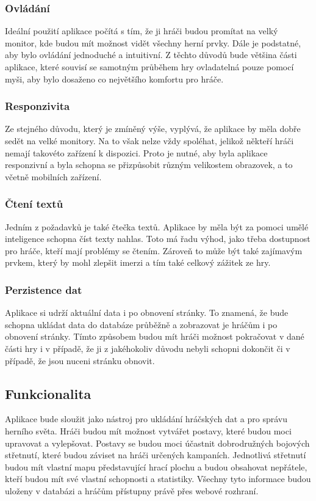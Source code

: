 \subsubsection*{Ovládání}
Ideální použití aplikace počítá s tím, že ji hráči budou promítat na velký monitor, kde budou mít možnost vidět všechny herní prvky. Dále je podstatné, aby bylo ovládání jednoduché a intuitivní. Z těchto důvodů bude většina části aplikace, které souvisí se samotným průběhem hry ovladatelná pouze pomocí myši, aby bylo dosaženo co největšího komfortu pro hráče.

\subsubsection*{Responzivita}
Ze stejného důvodu, který je zmíněný výše, vyplývá, že aplikace by měla dobře sedět na velké monitory. Na to však nelze vždy spoléhat, jelikož někteří hráči nemají takovéto zařízení k dispozici. Proto je nutné, aby byla aplikace responzivní a byla schopna se přizpůsobit různým velikostem obrazovek, a to včetně mobilních zařízení.

\subsubsection*{Čtení textů}
Jedním z požadavků je také čtečka textů. Aplikace by měla být za pomoci umělé inteligence schopna číst texty nahlas. Toto má řadu výhod, jako třeba dostupnost pro hráče, kteří mají problémy se čtením. Zároveň to může být také zajímavým prvkem, který by mohl zlepšit imerzi a tím také celkový zážitek ze hry.

\subsubsection*{Perzistence dat}
Aplikace si udrží aktuální data i po obnovení stránky. To znamená, že bude schopna ukládat data do databáze průběžně a zobrazovat je hráčům i po obnovení stránky. Tímto způsobem budou mít hráči možnost pokračovat v dané části hry i v případě, že ji z jakéhokoliv důvodu nebyli schopni dokončit či v případě, že jsou nuceni stránku obnovit.

\subsection{Funkcionalita}
Aplikace bude sloužit jako nástroj pro ukládání hráčských dat a pro správu herního světa. Hráči budou mít možnost vytvářet postavy, které budou moci upravovat a vylepšovat. Postavy se budou moci účastnit dobrodružných bojových střetnutí, které budou záviset na hráči určených kampaních. Jednotlivá střetnutí budou mít vlastní mapu představující hrací plochu a budou obsahovat nepřátele, kteří budou mít své vlastní schopnosti a statistiky. Všechny tyto informace budou uloženy v databázi a hráčům přístupny právě přes webové rozhraní.

